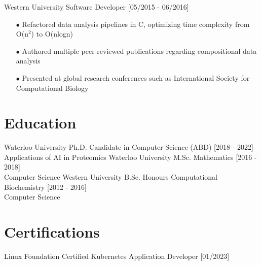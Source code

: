 \documentclass[]{twentysecondcv}
\begin{document}
\begin{twenty}
\twentyitem
    {Western University}
    {Software Developer}
    {[05/2015 - 06/2016]}
    {
    \begin{itemize}
        \item[$\bullet$] Refactored data analysis pipelines in C, optimizing time complexity from O(n$^2$) to O(nlogn) 
        \item[$\bullet$] Authored multiple peer-reviewed publications regarding compositional data analysis
        \item[$\bullet$]Presented at global research conferences such as International Society for Computational Biology
    \end{itemize}
}

\end{twenty}





\section{Education}
\vspace{-10px}
\begin{twenty}
  \twentyitem
    {Waterloo University}
    {Ph.D. Candidate in Computer Science (ABD)}
    {[2018 - 2022]}
    {\\ Applications of AI in Proteomics}
  \twentyitem
    {Waterloo University}
    {M.Sc. Mathematics}
    {[2016 - 2018]}
    {\\Computer Science}
  \twentyitem
    {Western University}
    {B.Sc. Honours Computational Biochemistry}
    {[2012 - 2016]}
    {\\Computer Science}
\end{twenty}


\section{Certifications}
\vspace{-12px}

\begin{twenty}
    \twentyitem
    {Linux Foundation}
    {Certified Kubernetes Application Developer}
    {[01/2023]}
    {}
\end{twenty}

\end{document}
